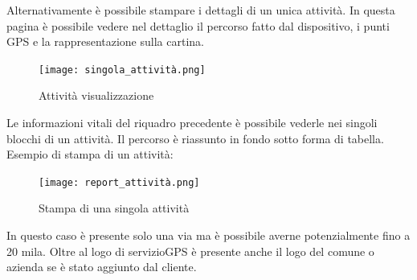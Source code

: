 \documentclass[12pt]{article}
\begin{document}
Alternativamente è possibile stampare i dettagli di un unica attività. 
In questa pagina è possibile vedere nel dettaglio il percorso fatto 
dal dispositivo, i punti GPS e la rappresentazione sulla cartina. 
\begin{figure}[H]
\texttt{[image: singola\_attività.png]}
\caption{Attività visualizzazione}
\end{figure}
Le informazioni vitali del riquadro precedente è possibile vederle nei singoli 
blocchi di un attività. Il percorso è riassunto in fondo sotto forma di tabella.
Esempio di stampa di un attività:
\begin{figure}[H]
\texttt{[image: report\_attività.png]}
\caption{Stampa di una singola attività}
\end{figure}
In questo caso è presente solo una via ma è possibile averne potenzialmente 
fino a 20 mila. 
Oltre al logo di servizioGPS è presente anche il logo del comune o azienda 
se è stato aggiunto dal cliente.
\end{document}
